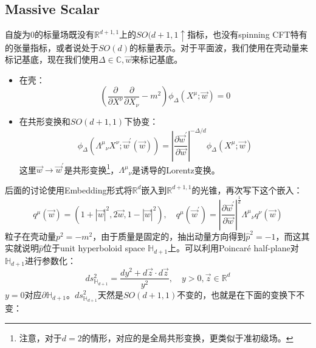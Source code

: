 \subsection{Massive Scalar}
\begin{definition}
自旋为$0$的标量场既没有$\mathbb{R}^{d+1,1}$上的$SO(d+1,1\uparrow$指标，也没有spinning CFT特有的张量指标，或者说处于$SO(d)$的标量表示。对于平面波，我们使用在壳动量来标记基底，现在我们使用$\Delta\in\mathbb{C},\vec{w}$来标记基底。
\begin{itemize}
	\item 在壳：
	\begin{equation}
		\left(\frac{\partial}{\partial X^{\nu}} \frac{\partial}{\partial X_{\nu}}-m^{2}\right) \phi_{\Delta}\left(X^{\mu} ; \vec{w}\right)=0
	\end{equation}
	\item 在共形变换和$SO(d+1,1)$下协变：
	\begin{equation}
		\phi_{\Delta}\left({\Lambda^{\mu}}_{\nu} X^{\nu} ; \vec{w}^{\prime}(\vec{w})\right)=\left|\frac{\partial \vec{w}^{\prime}}{\partial \vec{w}}\right|^{-\Delta / d} \phi_{\Delta}\left(X^{\mu} ; \vec{w}\right)
	\end{equation}
	这里$\vec{w}\to\vec{w}^\prime$是共形变换\footnote{注意，对于$d=2$的情形，对应的是全局共形变换，更类似于准初级场。}，${\Lambda^\mu}_\nu$是诱导的Lorentz变换。
\end{itemize}
\end{definition}
后面的讨论使用Embedding形式将$\mathbb{R}^{d}$嵌入到$\mathbb{R}^{d+1,1}$的光锥，再次写下这个嵌入：
\begin{equation}
	q^\mu(\vec{w})=\left(1+|\vec{w}|^2,2\vec{w},1-|\vec{w}|^2\right),\quad q^\mu(\vec{w}^\prime)=\left|\frac{\partial \vec{w}^\prime}{\partial\vec{w}}\right|^{\frac{1}{d}}{\Lambda^\mu}_\nu q^\nu(\vec{w})
\end{equation}
粒子在壳动量$p^2=-m^2$，由于质量是固定的，抽出动量方向得到$\hat p^2=-1$，而这其实就说明$\hat p$位于unit hyperboloid space $\mathbb{H}_{d+1}$上。可以利用Poincar\'e half-plane对$\mathbb{H}_{d+1}$进行参数化：
\begin{equation}
	ds^2_{\mathbb{H}_{d+1}}=\frac{dy^2+d\vec{z}\cdot d\vec{z}}{y^2},\quad y>0,\vec{z}\in\mathbb{R}^d
\end{equation}
$y=0$对应$\partial\mathbb{H}_{d+1}$。$ds^2_{\mathbb{H}_{d+1}}$天然是$SO(d+1,1)$不变的，也就是在下面的变换下不变：
